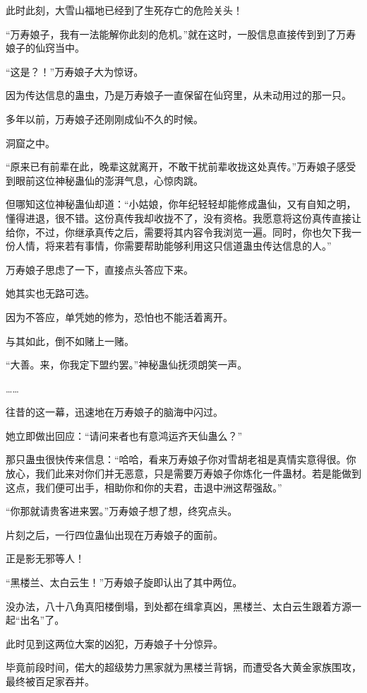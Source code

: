 \begin{this_body}
此时此刻，大雪山福地已经到了生死存亡的危险关头！

“万寿娘子，我有一法能解你此刻的危机。”就在这时，一股信息直接传到到了万寿娘子的仙窍当中。

“这是？！”万寿娘子大为惊讶。

因为传达信息的蛊虫，乃是万寿娘子一直保留在仙窍里，从未动用过的那一只。

多年以前，万寿娘子还刚刚成仙不久的时候。

洞窟之中。

“原来已有前辈在此，晚辈这就离开，不敢干扰前辈收拢这处真传。”万寿娘子感受到眼前这位神秘蛊仙的澎湃气息，心惊肉跳。

但哪知这位神秘蛊仙却道：“小姑娘，你年纪轻轻却能修成蛊仙，又有自知之明，懂得进退，很不错。这份真传我却收拢不了，没有资格。我愿意将这份真传直接让给你，不过，你继承真传之后，需要将其内容令我浏览一遍。同时，你也欠下我一份人情，将来若有事情，你需要帮助能够利用这只信道蛊虫传达信息的人。”

万寿娘子思虑了一下，直接点头答应下来。

她其实也无路可选。

因为不答应，单凭她的修为，恐怕也不能活着离开。

与其如此，倒不如赌上一赌。

“大善。来，你我定下盟约罢。”神秘蛊仙抚须朗笑一声。

……

往昔的这一幕，迅速地在万寿娘子的脑海中闪过。

她立即做出回应：“请问来者也有意鸿运齐天仙蛊么？”

那只蛊虫很快传来信息：“哈哈，看来万寿娘子你对雪胡老祖是真情实意得很。你放心，我们此来对你们并无恶意，只是需要万寿娘子你炼化一件蛊材。若是能做到这点，我们便可出手，相助你和你的夫君，击退中洲这帮强敌。”

“你那就请贵客进来罢。”万寿娘子想了想，终究点头。

片刻之后，一行四位蛊仙出现在万寿娘子的面前。

正是影无邪等人！

“黑楼兰、太白云生！”万寿娘子旋即认出了其中两位。

没办法，八十八角真阳楼倒塌，到处都在缉拿真凶，黑楼兰、太白云生跟着方源一起“出名”了。

此时见到这两位大案的凶犯，万寿娘子十分惊异。

毕竟前段时间，偌大的超级势力黑家就为黑楼兰背锅，而遭受各大黄金家族围攻，最终被百足家吞并。


\end{this_body}
